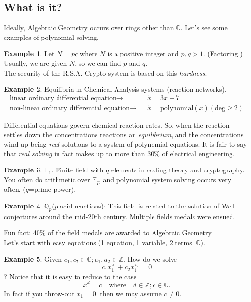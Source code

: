 \documentclass[]{article}
\theoremstyle{definition}
\newtheorem{ex}{Example}[section]
\begin{document}
		\subsection{What is it?}
		Ideally, Algebraic Geometry occurs over rings other than $\mathbb{C}$. Let's see some examples of polynomial solving.
			\begin{ex}
			Let $N=pq$ where $N$ is a positive integer and $p,q >1$. (Factoring.)
			Usually, we are given $N$, so we can find $p$ and $q$.\\
			The security of the R.S.A. Crypto-system is based on this \emph{hardness}.
			\end{ex}
			\begin{ex}
			Equilibria in Chemical Analysis systems (reaction networks).
			\begin{align*}
			\text{linear ordinary differential equation} \to &&\dot{x} = 3x+7\\
			\text{non-linear ordinary differential equation} \to &&\dot{x} = \text{polynomial}(x) (\text{deg}\geq 2)
			\end{align*}
			\end{ex}
			Differential equations govern chemical reaction rates. So, when the reaction settles down the concentrations reactions an \emph{equilibrium}, and the concentrations wind up being \emph{real} solutions to a system of polynomial equations.
			It is fair to say that \emph{real solving} in fact makes up to more than 30\% of electrical engineering.
			\begin{ex}
			$\mathbb{F}_1$: Finite field with $q$ elements in coding theory and cryptography. You often do arithmetic over $\mathbb{F}_q$, and polynomial system solving occurs very often. ($q$=prime power).
			\end{ex}
			\begin{ex}
			$\mathbb{Q}_p$($p$-acid reactions): This field is related to the solution of Weil-conjectures around the mid-20th century. Multiple fields medals were ensued.\\
			\end{ex}
			Fun fact: 40\% of the field medals are awarded to Algebraic Geometry.
			\\
			Let's start with easy equations (1 equation, 1 variable, 2 terms, $\mathbb{C}$).
			\begin{ex}
			Given $c_1,c_2 \in \mathbb{C}; a_1,a_2 \in \mathbb{Z}$. How do we solve
			\[ c_1x_1^{a_1}+c_2x_1^{a_2}=0\]?
			Notice that it is easy to reduce to the case
			\[ x^d=c \quad \text{where} \quad d\in\mathbb{Z}; c\in \mathbb{C}.\]
			In fact if you throw-out $x_1=0$, then we may assume $c\neq0$.
			\end{ex}
\end{document}

